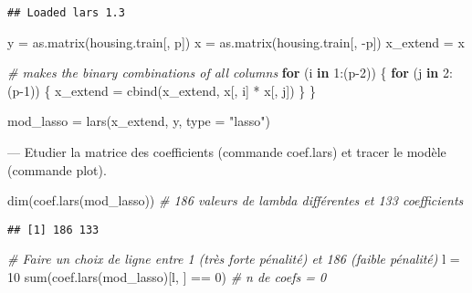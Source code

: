 \documentclass[
]{article}
\newenvironment{Shaded}{\begin{snugshade}}{\end{snugshade}}
\newcommand{\AttributeTok}[1]{\textcolor[rgb]{0.77,0.63,0.00}{#1}}
\newcommand{\CommentTok}[1]{\textcolor[rgb]{0.56,0.35,0.01}{\textit{#1}}}
\newcommand{\ControlFlowTok}[1]{\textcolor[rgb]{0.13,0.29,0.53}{\textbf{#1}}}
\newcommand{\DecValTok}[1]{\textcolor[rgb]{0.00,0.00,0.81}{#1}}
\newcommand{\FunctionTok}[1]{\textcolor[rgb]{0.00,0.00,0.00}{#1}}
\newcommand{\NormalTok}[1]{#1}
\newcommand{\OtherTok}[1]{\textcolor[rgb]{0.56,0.35,0.01}{#1}}
\newcommand{\SpecialCharTok}[1]{\textcolor[rgb]{0.00,0.00,0.00}{#1}}
\newcommand{\StringTok}[1]{\textcolor[rgb]{0.31,0.60,0.02}{#1}}
\begin{document}
\begin{verbatim}
## Loaded lars 1.3
\end{verbatim}

\begin{Shaded}
\begin{Highlighting}[]
\NormalTok{y }\OtherTok{=} \FunctionTok{as.matrix}\NormalTok{(housing.train[, p])}
\NormalTok{x }\OtherTok{=} \FunctionTok{as.matrix}\NormalTok{(housing.train[, }\SpecialCharTok{{-}}\NormalTok{p])}
\NormalTok{x\_extend }\OtherTok{=}\NormalTok{ x}

\CommentTok{\# makes the binary combinations of all columns}
\ControlFlowTok{for}\NormalTok{ (i }\ControlFlowTok{in} \DecValTok{1}\SpecialCharTok{:}\NormalTok{(p}\DecValTok{{-}2}\NormalTok{)) \{}
  \ControlFlowTok{for}\NormalTok{ (j }\ControlFlowTok{in} \DecValTok{2}\SpecialCharTok{:}\NormalTok{(p}\DecValTok{{-}1}\NormalTok{)) \{}
\NormalTok{    x\_extend }\OtherTok{=} \FunctionTok{cbind}\NormalTok{(x\_extend, x[, i] }\SpecialCharTok{*}\NormalTok{ x[, j])}
\NormalTok{  \}}
\NormalTok{\}}

\NormalTok{mod\_lasso }\OtherTok{=} \FunctionTok{lars}\NormalTok{(x\_extend, y, }\AttributeTok{type =} \StringTok{"lasso"}\NormalTok{)}
\end{Highlighting}
\end{Shaded}

--- Etudier la matrice des coefficients (commande coef.lars) et tracer
le modèle (commande plot).

\begin{Shaded}
\begin{Highlighting}[]
\FunctionTok{dim}\NormalTok{(}\FunctionTok{coef.lars}\NormalTok{(mod\_lasso)) }\CommentTok{\# 186 valeurs de lambda différentes et 133 coefficients}
\end{Highlighting}
\end{Shaded}

\begin{verbatim}
## [1] 186 133
\end{verbatim}

\begin{Shaded}
\begin{Highlighting}[]
\CommentTok{\# Faire un choix de ligne entre 1 (très forte pénalité) et 186 (faible pénalité)}
\NormalTok{l }\OtherTok{=} \DecValTok{10}
\FunctionTok{sum}\NormalTok{(}\FunctionTok{coef.lars}\NormalTok{(mod\_lasso)[l, ] }\SpecialCharTok{==} \DecValTok{0}\NormalTok{)  }\CommentTok{\# n de coefs = 0}
\end{Highlighting}
\end{Shaded}
\end{document}
